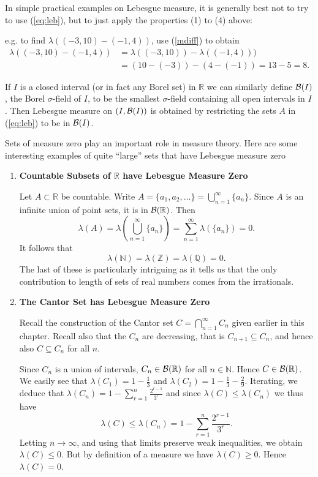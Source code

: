 \documentclass[a4paper]{report}
\numberwithin{equation}{chapter}
\numberwithin{thm_counter}{section}
\newcommand{\nN}{n \in \mathbb{N}}
\newcommand{\ds}{\displaystyle}
\def\to{\rightarrow} %
\def\sw{\subseteq} %
\def\mb{\mathbb} %
\def\R{\mb{R}} %
\begin{document}
In simple practical examples on Lebesgue measure, it is generally best not to try to use (\ref{eq:leb}), but to just apply the properties (1) to (4) above:

 

e.g. to find $\lambda((-3, 10) - (-1, 4))$, use (\ref{mdiff}) to obtain
$$\begin{aligned}
\lambda((-3, 10) - (-1, 4)) & =  \lambda((-3, 10)) - \lambda((-1, 4)))\\
& =  (10 - (-3)) - (4 - (-1)) = 13 - 5 = 8. 
\end{aligned}$$
 

If $I$ is a closed interval (or in fact any Borel set) in $\R$ we can similarly define ${\cal B}(I)$, the Borel $\sigma$-field of $I$, to be the smallest $\sigma$-field containing all open intervals in $I$. Then Lebesgue measure on $(I, {\cal B}(I))$ is obtained by restricting the sets $A$ in (\ref{eq:leb}) to be in ${\cal B}(I)$.

Sets of measure zero play an important role in measure theory. Here are some interesting examples of quite ``large'' sets that have Lebesgue measure zero

\begin{enumerate}

\item {\bf Countable Subsets of $\R$ have Lebesgue Measure Zero}

 

Let $A \subset \R$ be countable.  Write $A = \{a_{1}, a_{2}, \ldots \} = \bigcup_{n=1}^{\infty}\{a_{n}\}$. Since $A$ is an infinite union of point sets, it is in ${\cal B}(\R)$. Then $$\lambda(A) = \lambda\left(\bigcup_{n=1}^{\infty}\{a_{n}\}\right) = \sum_{n=1}^{\infty}\lambda(\{a_{n}\}) = 0.$$ It follows that
$$ \lambda(\mathbb{N}) = \lambda(\mathbb{Z}) = \lambda(\mathbb{Q}) = 0.$$
The last of these is particularly intriguing as it tells us that the only contribution to length of sets of real numbers comes from the irrationals.

 

\item {\bf The Cantor Set has Lebesgue Measure Zero}

 

Recall the construction of the Cantor set $C = \bigcap_{n=1}^{\infty}C_{n}$ given earlier in this chapter. 
Recall also that the $C_n$ are decreasing, that is $C_{n+1}\sw C_n$, and hence also $C\sw C_n$ for all $n$.

Since $C_{n}$ is a union of intervals, $C_{n} \in {\cal B}(\R)$ for all $\nN$. Hence $C \in {\cal B}(\R)$.
We easily see that $\lambda(C_{1}) = 1 - \frac{1}{3}$ and $\lambda(C_{2}) = 1 - \frac{1}{3} - \frac{2}{9}$. Iterating, we deduce that $\lambda(C_{n}) = 1 - \sum_{r=1}^{n}\frac{2^{r-1}}{3^{r}}$ and since $\lambda(C)\leq\lambda(C_n)$ we thus have
$$\lambda(C)\leq\lambda(C_n)=1 - \ds\sum_{r=1}^{n}\frac{2^{r-1}}{3^{r}}.$$
Letting $n\to\infty$, and using that limits preserve weak inequalities, we obtain $\lambda(C)\leq 0$. But by definition of a measure we have $\lambda(C)\geq 0$. Hence $\lambda(C)=0$.


\end{enumerate}
\end{document}
